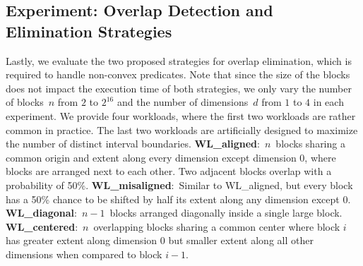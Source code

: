\documentclass[conference]{IEEEtran}
\begin{document}
\subsection{Experiment: Overlap Detection and Elimination Strategies}
\vspace*{-0.1cm}
Lastly, we evaluate the two proposed strategies for overlap elimination, which is required to handle non-convex predicates.
Note that since the size of the blocks does not impact the execution time of both strategies, we only vary the number of blocks~$n$ from $2$ to $2^{16}$ and the number of dimensions~$d$ from $1$ to $4$ in each experiment.
We provide four workloads, where the first two workloads are rather common in practice. The last two workloads are artificially designed to maximize the number of distinct interval boundaries.
\textbf{WL\_aligned}:~$n$~blocks sharing a common origin and extent along every dimension except dimension 0, where blocks are arranged next to each other. Two adjacent blocks overlap with a probability of 50\%.
\textbf{WL\_misaligned}:~Similar to WL\_aligned, but every block has a 50\% chance to be shifted by half its extent along any dimension except 0.
\textbf{WL\_diagonal}:~\mbox{$n-1$}~blocks arranged diagonally inside a single large block.
\textbf{WL\_centered}:~$n$~overlapping blocks sharing a common center where block $i$ has greater extent along dimension 0 but smaller extent along all other dimensions when compared to block $i-1$.
\end{document}
